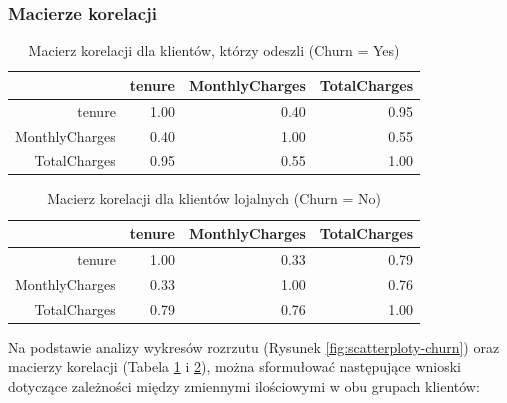 \documentclass[12pt, a4paper]{article}\usepackage[]{graphicx}\usepackage[]{xcolor}
\begin{document}
\subsubsection{Macierze korelacji}
\begin{table}[ht]
\centering
\caption{Macierz korelacji dla klientów, którzy odeszli (Churn = Yes)} 
\label{tab:korelacja_yes}
\begin{tabular}{rrrr}
  \hline
 & tenure & MonthlyCharges & TotalCharges \\ 
  \hline
tenure & 1.00 & 0.40 & 0.95 \\ 
  MonthlyCharges & 0.40 & 1.00 & 0.55 \\ 
  TotalCharges & 0.95 & 0.55 & 1.00 \\ 
   \hline
\end{tabular}
\end{table}
\begin{table}[ht]
\centering
\caption{Macierz korelacji dla klientów lojalnych (Churn = No)} 
\label{tab:korelacja_no}
\begin{tabular}{rrrr}
  \hline
 & tenure & MonthlyCharges & TotalCharges \\ 
  \hline
tenure & 1.00 & 0.33 & 0.79 \\ 
  MonthlyCharges & 0.33 & 1.00 & 0.76 \\ 
  TotalCharges & 0.79 & 0.76 & 1.00 \\ 
   \hline
\end{tabular}
\end{table}



Na podstawie analizy wykresów rozrzutu (Rysunek \ref{fig:scatterploty-churn}) oraz macierzy korelacji (Tabela \ref{tab:korelacja_yes} i \ref{tab:korelacja_no}), można sformułować następujące wnioski dotyczące zależności między zmiennymi ilościowymi w obu grupach klientów:
\end{document}
